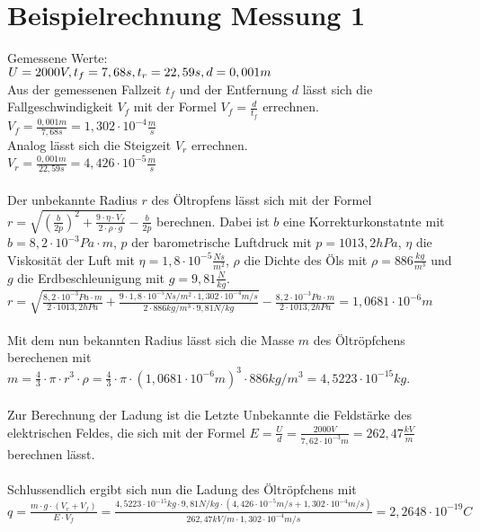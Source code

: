 \section*{Beispielrechnung Messung 1}
Gemessene Werte: \\
$U = 2000V,		\\
t_f = 7,68s,	\\
t_r = 22,59s,	\\
d = 0,001m 		\\ $
\\
Aus der gemessenen Fallzeit $t_f$ und der Entfernung $d$ lässt sich die Fallgeschwindigkeit $V_f$ mit der Formel $V_f = \frac{d}{t_f}$ errechnen. \\
$V_f = \frac{0,001m}{7,68s} = 1,302 \cdot 10^{-4} \frac{m}{s}$	\\
Analog lässt sich die Steigzeit $V_r$ errechnen. \\
$V_r = \frac{0,001m}{22,59s} = 4,426 \cdot 10^{-5} \frac{m}{s}$ \\
\\ Der unbekannte Radius $r$ des Öltropfens lässt sich mit der Formel $r=\sqrt{(\frac{b}{2p})^{2} + \frac{9 \cdot \eta \cdot V_f}{2\cdot \rho \cdot g}} - \frac{b}{2p}$ berechnen. Dabei ist $b$ eine Korrekturkonstatnte mit $b=8,2 \cdot 10^{-3} Pa \cdot m$, $p$ der barometrische Luftdruck mit $p = 1013,2 hPa$, $\eta$ die Viskosität der Luft mit $\eta = 1,8 \cdot 10^{-5} \frac{Ns}{m^2}$, $\rho$ die Dichte des Öls mit $\rho = 886 \frac{kg}{m^3}$ und $g$ die Erdbeschleunigung mit $g = 9,81\frac{N}{kg}$.
\\
$r=\sqrt{\frac{8,2\cdot10^{-3}Pa\cdot m}{2\cdot 1013,2 hPa}+\frac{9\cdot 1,8\cdot 10^{-5}Ns/m^2 \cdot 1,302 \cdot 10^{-4} m/s}{2\cdot 886kg/m^3 \cdot 9,81N/kg}}-\frac{8,2\cdot 10^{-3}Pa\cdot m}{2\cdot 1013,2 hPa} = 1,0681\cdot 10^{-6}m$
\\ \\
Mit dem nun bekannten Radius lässt sich die Masse $m$ des Öltröpfchens berechenen mit $m=\frac{4}{3}\cdot \pi \cdot r^3 \cdot \rho = \frac{4}{3} \cdot \pi \cdot (1,0681\cdot 10^{-6}m)^3 \cdot 886kg/m^3 = 4,5223\cdot 10^{-15}kg$.
\\ \\
Zur Berechnung der Ladung ist die Letzte Unbekannte die Feldstärke des elektrischen Feldes, die sich mit der Formel $E=\frac{U}{d} = \frac{2000V}{7,62\cdot 10^{-3}m} = 262,47\frac{kV}{m}$ berechnen lässt.
\\ \\
Schlussendlich ergibt sich nun die Ladung des Öltröpfchens mit \\
$q=\frac{m\cdot g \cdot (V_r + V_f)}{E \cdot V_f}=\frac{4,5223 \cdot 10^{-15}kg \cdot 9,81N/kg\cdot (4,426\cdot 10^{-5}m/s + 1,302\cdot 10^{-4}m/s)}{262,47kV/m \cdot 1,302\cdot 10^{-4}m/s}=2,2648 \cdot 10^{-19}C$